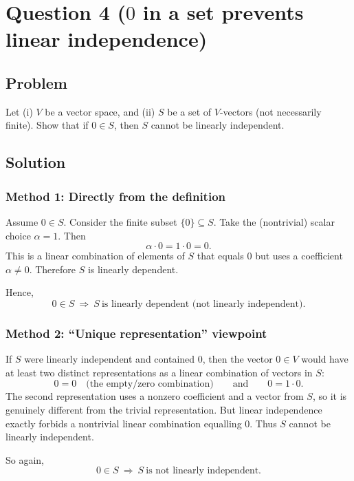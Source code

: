 \documentclass[12pt]{article}
\begin{document}
\section{Question 4 (\(0\) in a set prevents linear independence)}
\subsection{Problem}
Let (i) \(V\) be a vector space, and (ii) \(S\) be a set of \(V\)-vectors (not necessarily finite).
Show that if \(0\in S\), then \(S\) cannot be linearly independent.

\subsection{Solution}

\subsubsection{Method 1: Directly from the definition}
Assume \(0\in S\).
Consider the finite subset \(\{0\}\subseteq S\).
Take the (nontrivial) scalar choice \(\alpha=1\).
Then
\[
\alpha\cdot 0 = 1\cdot 0 = 0.
\]
This is a linear combination of elements of \(S\) that equals \(0\) but uses a coefficient \(\alpha\neq 0\).
Therefore \(S\) is linearly dependent.

Hence,
\[
\boxed{\,0\in S\ \Longrightarrow\ S\ \text{is linearly dependent (not linearly independent).}\,}
\]

\subsubsection{Method 2: ``Unique representation'' viewpoint}
If \(S\) were linearly independent and contained \(0\), then the vector \(0\in V\) would have at least two distinct representations as a linear combination of vectors in \(S\):
\[
0 = 0 \quad\text{(the empty/zero combination)}
\qquad\text{and}\qquad
0 = 1\cdot 0.
\]
The second representation uses a nonzero coefficient and a vector from \(S\), so it is genuinely different from the trivial representation.
But linear independence exactly forbids a nontrivial linear combination equalling \(0\).
Thus \(S\) cannot be linearly independent.

So again,
\[
\boxed{\,0\in S\ \Longrightarrow\ S\ \text{is not linearly independent.}\,}
\]

\newpage
\end{document}
